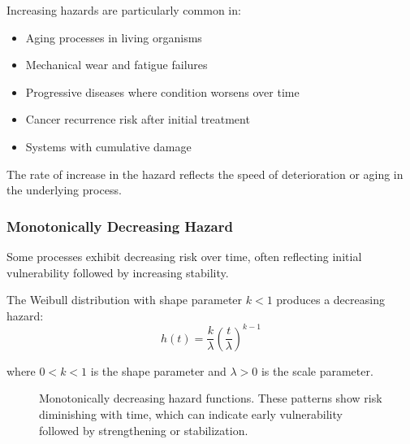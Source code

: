 Increasing hazards are particularly common in:
\begin{itemize}
    \item Aging processes in living organisms
    \item Mechanical wear and fatigue failures
    \item Progressive diseases where condition worsens over time
    \item Cancer recurrence risk after initial treatment
    \item Systems with cumulative damage
\end{itemize}

The rate of increase in the hazard reflects the speed of deterioration or aging in the underlying process.

\subsubsection{Monotonically Decreasing Hazard}

Some processes exhibit decreasing risk over time, often reflecting initial vulnerability followed by increasing stability.

\begin{equationbox}[title=Weibull Decreasing Hazard]
The Weibull distribution with shape parameter $k < 1$ produces a decreasing hazard:
\begin{equation}
    h(t) = \frac{k}{\lambda}\left(\frac{t}{\lambda}\right)^{k-1}
\end{equation}

where $0 < k < 1$ is the shape parameter and $\lambda > 0$ is the scale parameter.
\end{equationbox}

\begin{figure}[htbp]
    \centering
    \caption{Monotonically decreasing hazard functions. These patterns show risk diminishing with time, which can indicate early vulnerability followed by strengthening or stabilization.}
    \label{fig:decreasing-hazard}
\end{figure}

